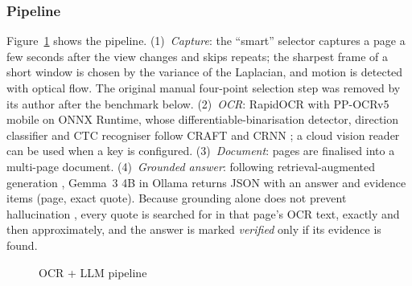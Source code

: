 \documentclass[12pt,singleside,a4paper]{article}
\begin{document}
\subsubsection{Pipeline}
Figure~\ref{fig:ocrpipe} shows the pipeline. (1)~\emph{Capture}: the ``smart'' selector captures a page a few seconds after the view changes and skips repeats; the sharpest frame of a short window is chosen by the variance of the Laplacian, and motion is detected with optical flow. The original manual four-point selection step was removed by its author after the benchmark below. (2)~\emph{OCR}: RapidOCR with PP-OCRv5 mobile \cite{du2020ppocr,rapidocr} on ONNX Runtime, whose differentiable-binarisation detector, direction classifier and CTC recogniser follow CRAFT \cite{baek2019} and CRNN \cite{shi2017}; a cloud vision reader can be used when a key is configured. (3)~\emph{Document}: pages are finalised into a multi-page document. (4)~\emph{Grounded answer}: following retrieval-augmented generation \cite{lewis2020}, Gemma~3 4B \cite{gemma3} in Ollama returns JSON with an answer and evidence items (page, exact quote). Because grounding alone does not prevent hallucination \cite{ji2023}, every quote is searched for in that page's OCR text, exactly and then approximately, and the answer is marked \emph{verified} only if its evidence is found.

\begin{figure}[H]
\centering
{}
\caption{OCR + LLM pipeline}
\label{fig:ocrpipe}
\end{figure}
\end{document}
